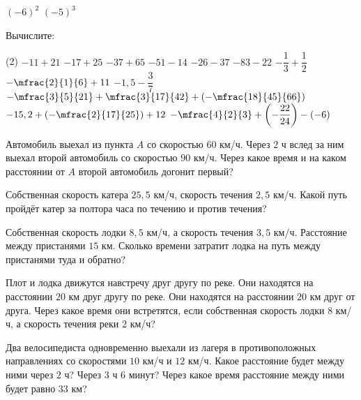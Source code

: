 \begin{class}[number=1-2]
\begin{listofex}[resume]
\begin{tasks}
			\task \( (-6)^2 \)
			\task \( (-5)^3 \)
		\end{tasks}
		\newpage
		\item Вычислите:
		\begin{tasks}(2)
			\task \( -11 + 21 \)
			\task \( -17+25 \)
			\task \( -37+65 \)
			\task \( -51-14 \)
			\task \( -26-37 \)
			\task \( -83-22 \)
			\task \( -\dfrac{1}{3}+\dfrac{1}{2} \)
			\task \( -\mfrac{2}{1}{6}+11 \)
			\task \( -1,5-\dfrac{3}{7} \)
			\task \( -\mfrac{3}{5}{21}+\mfrac{3}{17}{42}+\left(-\mfrac{18}{45}{66}\right) \)
			\task \( -15,2 + \left(-\mfrac{2}{17}{25}\right) + 12 \)
			\task \( -\mfrac{4}{2}{3} + \left(-\dfrac{22}{24}\right) - (-6) \)
		\end{tasks}
		\item Автомобиль выехал из пункта \(A\) со скоростью \(60\) км/ч. Через \(2\) ч вслед за ним выехал второй автомобиль со скоростью \(90\) км/ч. Через какое время и на каком расстоянии от \(A\) второй автомобиль догонит первый?
		\item Собственная скорость катера \(25,5\) км/ч, скорость течения \(2,5\) км/ч. Какой путь пройдёт катер за полтора часа по течению и против течения?
		\item Собственная скорость лодки \(8,5\) км/ч, а скорость течения \(3,5\) км/ч. Расстояние между пристанями \(15\) км. Сколько времени затратит лодка на путь между пристанями туда и обратно?
		\item Плот и лодка движутся навстречу друг другу по реке. Они находятся на расстоянии \(20\) км друг другу по реке. Они находятся на расстоянии \(20\) км друг от друга. Через какое время они встретятся, если собственная скорость лодки \(8\) км/ч, а скорость течения реки \(2\) км/ч?
		\item Два велосипедиста одновременно выехали из лагеря в противоположных направлениях со скоростями \(10\) км/ч и \(12\) км/ч. Какое расстояние будет между ними через \(2\) ч? Через \(3\) ч \(6\) минут? Через какое время расстояние между ними будет равно \(33\) км?
	\end{listofex}
\end{class}

